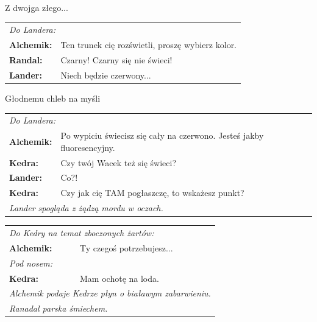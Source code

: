 \documentclass[10pt,twoside,twocolumn]{book}
\begin{document}
\begin{rpg-quotebox}{Z dwojga złego...}
   \begin{tabularx}{\columnwidth}{lX}
      \multicolumn{2}{l}{\textit{Do Landera:}}\\
      \textbf{Alchemik:} & Ten trunek cię rozświetli, proszę wybierz kolor.\\
      \textbf{Randal:} & Czarny! Czarny się nie świeci!\\
      \textbf{Lander:} & Niech będzie czerwony...\\
   \end{tabularx}
\end{rpg-quotebox}


\begin{rpg-quotebox}{Głodnemu chleb na myśli}
   \begin{tabularx}{\columnwidth}{lX}
      \multicolumn{2}{l}{\textit{Do Landera:}}\\
      \textbf{Alchemik:} & Po wypiciu świecisz się cały na czerwono. Jesteś jakby fluoresencyjny.\\
      \textbf{Kedra:} & Czy twój Wacek też się świeci?\\
      \textbf{Lander:} & Co?!\\
      \textbf{Kedra:} & Czy jak cię TAM pogłaszczę, to wskażesz punkt?\\
      \multicolumn{2}{l}{\textit{Lander spogląda z żądzą mordu w oczach.}}\\
   \end{tabularx}
\end{rpg-quotebox}


\begin{rpg-quotebox}{}
   \begin{tabularx}{\columnwidth}{lX}
      \multicolumn{2}{l}{\textit{Do Kedry na temat zboczonych żartów:}}\\
      \textbf{Alchemik:} & Ty czegoś potrzebujesz...\\
      \multicolumn{2}{l}{\textit{Pod nosem:}}\\
      \textbf{Kedra:} & Mam ochotę na loda.\\
      \multicolumn{2}{l}{\textit{Alchemik podaje Kedrze płyn o białawym zabarwieniu.}}\\
      \multicolumn{2}{l}{\textit{Ranadal parska śmiechem.}}\\
   \end{tabularx}
\end{rpg-quotebox}
\end{document}
